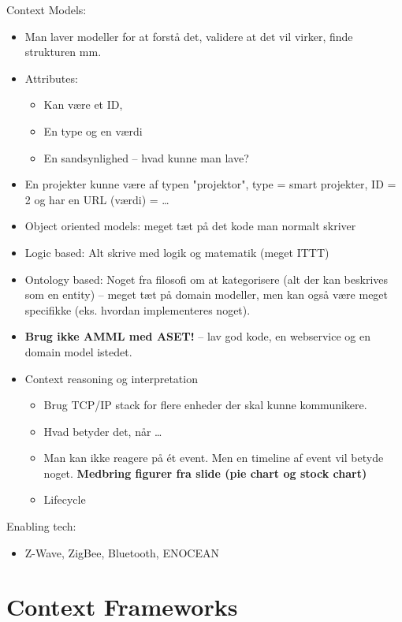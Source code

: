 \documentclass[oneside, 10pt]{article}
\begin{document}
Context Models:
\begin{itemize}
	\item Man laver modeller for at forstå det, validere at det vil virker, finde strukturen mm.
	\item Attributes:
	\begin{itemize}
		\item Kan være et ID,
		\item En type og en værdi
		\item En sandsynlighed -- hvad kunne man lave?
	\end{itemize}
	\item En projekter kunne være af typen "projektor", type = smart projekter, ID = 2 og har en URL (værdi) = \dots
	\item Object oriented models:  meget tæt på det kode man normalt skriver
	\item Logic based: Alt skrive med logik og matematik (meget ITTT)
	\item Ontology based: Noget fra filosofi om at kategorisere (alt der kan beskrives som en entity) -- meget tæt på domain modeller, men kan også være meget specifikke (eks. hvordan implementeres noget).
	\item \textbf{Brug ikke AMML med ASET!} -- lav god kode, en webservice og en domain model istedet.

	\item Context reasoning og interpretation
	\begin{itemize}
		\item Brug TCP/IP stack for flere enheder der skal kunne kommunikere.
		\item Hvad betyder det, når \dots
		\item Man kan ikke reagere på ét event. Men en timeline af event vil betyde noget. \textbf{Medbring figurer fra slide (pie chart og stock chart)}
	\end{itemize}
	\begin{itemize}
		\item Lifecycle
	\end{itemize}
\end{itemize}

Enabling tech:
\begin{itemize}
	\item Z-Wave, ZigBee, Bluetooth, ENOCEAN
\end{itemize}





\newpage
\section{Context Frameworks}
\end{document}
